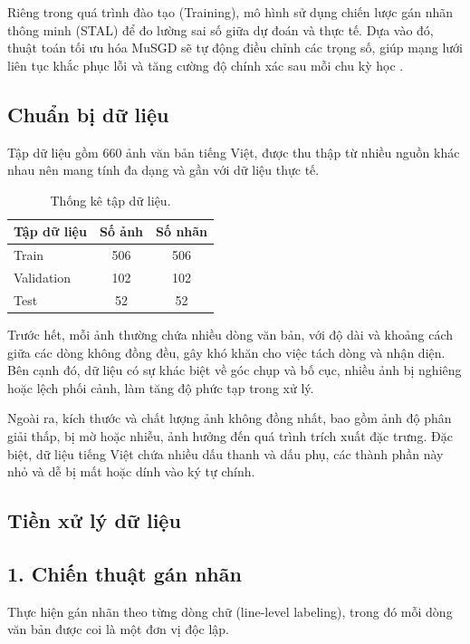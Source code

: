 Riêng trong quá trình đào tạo (Training), mô hình sử dụng chiến lược gán nhãn thông minh (STAL) để đo lường sai số giữa dự đoán và thực tế. Dựa vào đó, thuật toán tối ưu hóa MuSGD sẽ tự động điều chỉnh các trọng số, giúp mạng lưới liên tục khắc phục lỗi và tăng cường độ chính xác sau mỗi chu kỳ học \cite{Reference18}.

\subsection{Chuẩn bị dữ liệu}
Tập dữ liệu gồm 660 ảnh văn bản tiếng Việt, được thu thập từ nhiều nguồn khác nhau nên mang tính đa dạng và gần với dữ liệu thực tế.

\begin{table}[h]
    \centering
    \begin{tabular}{lcc}
        \toprule
        \textbf{Tập dữ liệu} & \textbf{Số ảnh} & \textbf{Số nhãn} \\
        \midrule
        Train      & 506 & 506 \\
        Validation & 102 & 102 \\
        Test       & 52 & 52 \\
        \bottomrule
    \end{tabular}
    \caption{Thống kê tập dữ liệu.}
    \label{tab:dataset}
\end{table}

Trước hết, mỗi ảnh thường chứa nhiều dòng văn bản, với độ dài và khoảng cách giữa các dòng không đồng đều, gây khó khăn cho việc tách dòng và nhận diện. Bên cạnh đó, dữ liệu có sự khác biệt về góc chụp và bố cục, nhiều ảnh bị nghiêng hoặc lệch phối cảnh, làm tăng độ phức tạp trong xử lý.

Ngoài ra, kích thước và chất lượng ảnh không đồng nhất, bao gồm ảnh độ phân giải thấp, bị mờ hoặc nhiễu, ảnh hưởng đến quá trình trích xuất đặc trưng. Đặc biệt, dữ liệu tiếng Việt chứa nhiều dấu thanh và dấu phụ, các thành phần này nhỏ và dễ bị mất hoặc dính vào ký tự chính.

\subsection{Tiền xử lý dữ liệu}

\subsection*{1. Chiến thuật gán nhãn}
Thực hiện gán nhãn theo từng dòng chữ (line-level labeling), trong đó mỗi dòng văn bản được coi là một đơn vị độc lập.

